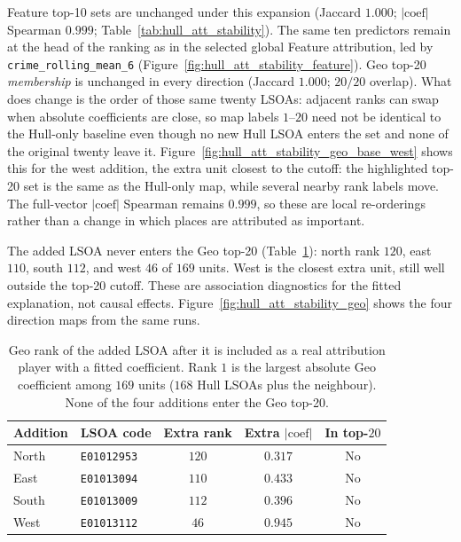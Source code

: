 Feature top-10 sets are unchanged under this expansion (Jaccard $1.000$; $|\mathrm{coef}|$ Spearman $0.999$; Table~\ref{tab:hull_att_stability}). The same ten predictors remain at the head of the ranking as in the selected global Feature attribution, led by \texttt{crime\_rolling\_mean\_6} (Figure~\ref{fig:hull_att_stability_feature}). Geo top-20 \emph{membership} is unchanged in every direction (Jaccard $1.000$; $20/20$ overlap). What does change is the order of those same twenty LSOAs: adjacent ranks can swap when absolute coefficients are close, so map labels $1$--$20$ need not be identical to the Hull-only baseline even though no new Hull LSOA enters the set and none of the original twenty leave it. Figure~\ref{fig:hull_att_stability_geo_base_west} shows this for the west addition, the extra unit closest to the cutoff: the highlighted top-20 set is the same as the Hull-only map, while several nearby rank labels move. The full-vector $|\mathrm{coef}|$ Spearman remains $0.999$, so these are local re-orderings rather than a change in which places are attributed as important.

The added LSOA never enters the Geo top-20 (Table~\ref{tab:hull_att_stability_extra}): north rank $120$, east $110$, south $112$, and west $46$ of $169$ units. West is the closest extra unit, still well outside the top-20 cutoff. These are association diagnostics for the fitted explanation, not causal effects. Figure~\ref{fig:hull_att_stability_geo} shows the four direction maps from the same runs.

\begin{table}[H]
\centering
\caption{Geo rank of the added LSOA after it is included as a real attribution player with a fitted coefficient.
Rank $1$ is the largest absolute Geo coefficient among $169$ units ($168$ Hull LSOAs plus the neighbour).
None of the four additions enter the Geo top-20.}
\label{tab:hull_att_stability_extra}
\begin{tabular}{llccc}
\toprule
Addition & LSOA code & Extra rank & Extra $\lvert\mathrm{coef}\rvert$ & In top-$20$ \\
\midrule
North & \texttt{E01012953} & $120$ & $0.317$ & No \\
East  & \texttt{E01013094} & $110$ & $0.433$ & No \\
South & \texttt{E01013009} & $112$ & $0.396$ & No \\
West  & \texttt{E01013112} & $46$  & $0.945$ & No \\
\bottomrule
\end{tabular}
\end{table}

